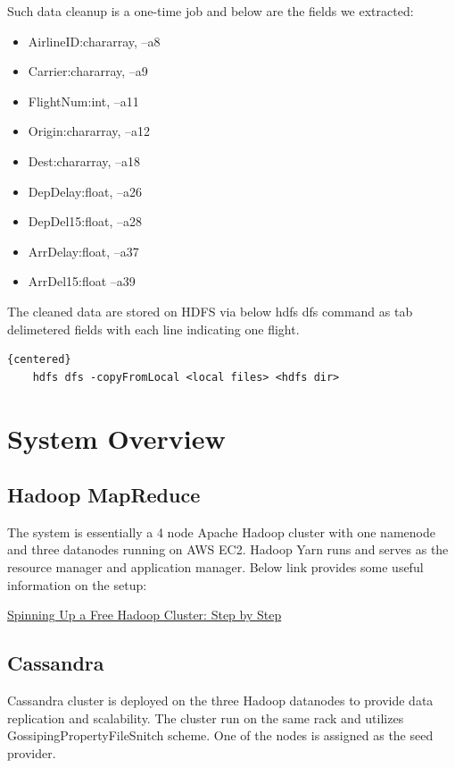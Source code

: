 \documentclass[fontsize=11pt,paper=a4]{scrartcl}
\begin{document}
\par Such data cleanup is a one-time job and below are the fields we extracted: 
\begin{itemize}
\item       AirlineID:chararray, --a8
\item       Carrier:chararray,   --a9
\item       FlightNum:int,       --a11
\item       Origin:chararray,    --a12       
\item       Dest:chararray,      --a18
\item       DepDelay:float,      --a26
\item       DepDel15:float,      --a28
\item       ArrDelay:float,      --a37 
\item       ArrDel15:float       --a39
\end{itemize}

\par The cleaned data are stored on HDFS via below hdfs dfs command  as tab delimetered fields with each line indicating one flight. 
\begin{lstlisting}{centered}
	hdfs dfs -copyFromLocal <local files> <hdfs dir>  
\end{lstlisting}
 
\section{System Overview}
\subsection{Hadoop MapReduce}
The system is essentially a 4 node Apache Hadoop cluster with one namenode and three datanodes running on AWS EC2. 
Hadoop Yarn runs and serves as the resource manager and application manager. Below link provides some useful information on the setup: 

\href{https://blog.insightdatascience.com/spinning-up-a-free-hadoop-cluster-step-by-step-c406d56bae42}{Spinning Up a Free Hadoop Cluster: Step by Step}


\subsection{Cassandra} 
Cassandra cluster is deployed on the three Hadoop datanodes to provide data replication and scalability. 
The cluster run on the same rack and utilizes GossipingPropertyFileSnitch scheme. One of the nodes is assigned as the seed provider.
 
\end{document}
